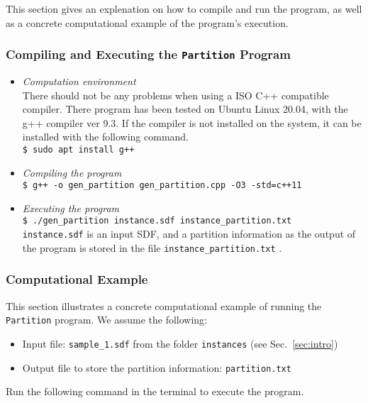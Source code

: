 \documentclass[11pt,titlepage,dvipdfmx,twoside]{article}
\begin{document}
This section gives an explenation on how to compile and run the program,
as well as a concrete computational example of the program's execution.


\subsubsection{Compiling and Executing the {\tt Partition} Program}
\label{sec:compile_p}
\begin{itemize}
	\item {\em Computation environment}\\
		There should not be any problems when using a ISO C++ compatible compiler. %
		There program has been tested on 
		Ubuntu Linux 20.04,  with the  g++ compiler ver 9.3.
		If the compiler is not installed on the system, it can be installed with
		the following command.\\
		\verb|$ sudo apt install g++|
	\item {\em Compiling the program}\\
		\verb|$ g++ -o gen_partition gen_partition.cpp -O3 -std=c++11|\\
	\item {\em Executing the program}\\
		\verb|$ ./gen_partition instance.sdf instance_partition.txt|\\
		\verb|instance.sdf|  is an input SDF, 
		and a partition information as the output of the program is stored in the file
	  \verb|instance_partition.txt| .
\end{itemize}


\subsubsection{Computational Example}
\label{sec:instance_p}

This section illustrates a concrete computational 
example of running the {\tt Partition} program.
We assume the following:
%
\begin{itemize}
\item Input file: {\tt sample\_1.sdf} from the folder {\tt instances} (see Sec.~\ref{sec:intro})
\item Output file to store the partition information: {\tt partition.txt}
\end{itemize}

Run the following command in the terminal to execute the program.

\bigskip
\end{document}
